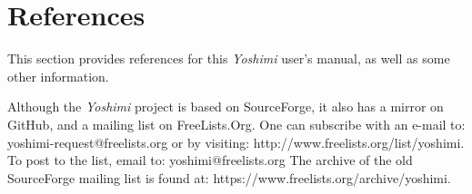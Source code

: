%
%
%

\section{References}
\label{sec:yumreferences}

   This section provides references for this \textsl{Yoshimi} user's manual, as
   well as some other information.
   
   Although the \textsl{Yoshimi} project is based on SourceForge, it also has a
   mirror on GitHub, and a mailing list on FreeLists.Org.
   One can subscribe with an e-mail to: yoshimi-request@freelists.org
   or by visiting: http://www.freelists.org/list/yoshimi.
   To post to the list, email to: yoshimi@freelists.org
   The archive of the old SourceForge mailing list is found
   at: https://www.freelists.org/archive/yoshimi.

%


